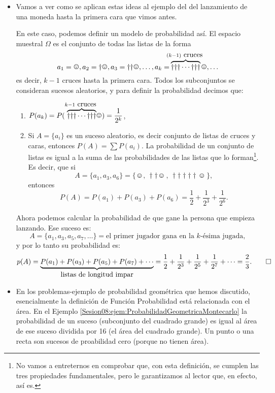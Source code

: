 \begin{itemize}
    \item Vamos a ver como se aplican estas ideas al ejemplo del del lanzamiento de una moneda hasta la primera cara que vimos antes.
        \begin{Ejemplo}
        En este caso, podemos definir un modelo de probabilidad así. El espacio muestral $\Omega$ es el conjunto de todas las listas de la forma
        \[a_1=\smiley, a_2=\dag\smiley, a_3=\dag \dag\smiley,\ldots,a_k=\hspace{-7pt}\overbrace{\dag \dag \dag \cdots\dag \dag \dag }^{(k-1)\mbox{ cruces }}\hspace{-7pt}\smiley,\ldots\]
        es decir, $k-1$ cruces hasta la primera cara. Todos los subconjuntos se consideran sucesos aleatorios, y para definir la probabilidad decimos que:
        \begin{enumerate}
            \item $P(a_k)=P(\overbrace{\dag \dag \dag \cdots\dag \dag \dag }^{k-1\mbox{ cruces }}\hspace{-5pt}\smiley)=\dfrac{1}{2^{k}}$,
            \item Si $A=\{a_i\}$ es un suceso aleatorio, es decir conjunto de listas de cruces y caras, entonces $P(A)=\sum P(a_i)$. La probabilidad de un conjunto de listas es igual a la suma de las probabilidades de las listas que lo forman\footnote{No vamos a entreternos en comprobar que, con esta definición, se cumplen las tres propiedades fundamentales, pero le garantizamos al lector que, en efecto, así es.}. Es decir, que si
                \[A=\{a_1,a_3,a_6\}=\{\smiley,\,\dag \dag\smiley\, ,\, \dag \dag \dag \dag \dag\smiley\,\},\]
                entonces
                \[P(A)=P(a_1)+P(a_3)+P(a_6)=\dfrac{1}{2}+\dfrac{1}{2^3}+\dfrac{1}{2^6}.\]
        \end{enumerate}
         Ahora podemos calcular la probabilidad de que gane la persona que empieza lanzando. Ese suceso es:
         \[A=\{a_1,a_3,a_5,a_7,\ldots\}=\mbox{el primer jugador gana en la $k$-ésima jugada},\]
         y por lo tanto su probabilidad es:
         \[p(A)=\underbrace{P(a_1)+P(a_3)+P(a_5)+P(a_7)+\cdots}_{\mbox{listas de longitud impar}}=
         \dfrac{1}{2}+\dfrac{1}{2^3}+\dfrac{1}{2^5}+\dfrac{1}{2^7}+\cdots=\dfrac{2}{3}.\qed\]
         \end{Ejemplo}

    \item En los problemas-ejemplo de probabilidad geométrica que hemos discutido, esencialmente la definición de Función Probabilidad está relacionada con el área. En el Ejemplo \ref{Sesion08:ejem:ProbabilidadGeometricaMontecarlo} la probabilidad de un suceso (subconjunto del cuadrado grande) es igual al área de ese suceso dividida por 16 (el área del cuadrado grande). Un punto o una recta son sucesos de proabilidad cero (porque no tienen área).


\end{itemize}
